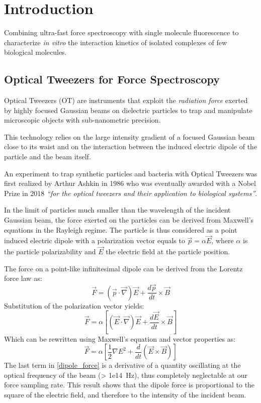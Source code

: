 \chapter{Introduction}




Combining ultra-fast force spectroscopy with single molecule
fluorescence to characterize \textit{in vitro} the interaction
kinetics of isolated complexes of few biological molecules.


\section{Optical Tweezers for Force Spectroscopy}

Optical Tweezers (OT) are instruments that exploit the
\emph{radiation force} exerted by highly focused Gaussian beams on
dielectric particles to trap and manipulate microscopic objects with
sub-nanometric precision.

This technology relies on the large intensity gradient of a focused
Gaussian beam close to its waist and on the interaction between the
induced electric dipole of the particle and the beam itself.

An experiment to trap synthetic particles and bacteria with Optical
Tweezers was first realized by Arthur Ashkin in 1986\cite{Ashkin:86}
who was eventually awarded with a Nobel Prize in 2018
\emph{``for the optical tweezers and their application to biological
systems''}.

In the limit of particles much smaller than the wavelength of the
incident Gaussian beam, the force exerted on the particles can be
derived from Maxwell's equations in the Rayleigh regime. The particle
is thus considered as a point induced electric dipole with a
polarization vector equals to $\vec{p} = \alpha \vec{E}$, where
$\alpha$ is the particle polarizability and $\vec{E}$ the electric
field at the particle position.

The force on a point-like infinitesimal dipole can be derived from
the Lorentz force law as:
$$ \vec{F} =
  \left( \vec{p} \cdot \vec{\nabla} \right) \vec{E}
  + \frac{d\vec{p}}{dt} \times \vec{B}
$$
Substitution of the polarization vector yields:
$$ \vec{F} = \alpha
\left[
    \left( \vec{E} \cdot \vec{\nabla} \right) \vec{E}
    + \frac{d\vec{E}}{dt} \times \vec{B}
\right]
$$
Which can be rewritten using Maxwell's equation and vector
properties as: 
\begin{equation}
\label{dipole_force}
\vec{F}
= \alpha 
\left[
    \frac{1}{2}\nabla E^2
    + \frac{d}{dt}\left(\vec{E} \times \vec{B}\right)
\right]
\end{equation}
The last term in \ref{dipole_force} is a derivative of a quantity
oscillating at the optical frequency of the beam (\SI{> 1e14}{\Hz}),
thus completely neglectable at our force sampling rate.
This result shows that the dipole force is proportional to the square
of the electric field, and therefore to the intensity of the incident
beam.

\section{}